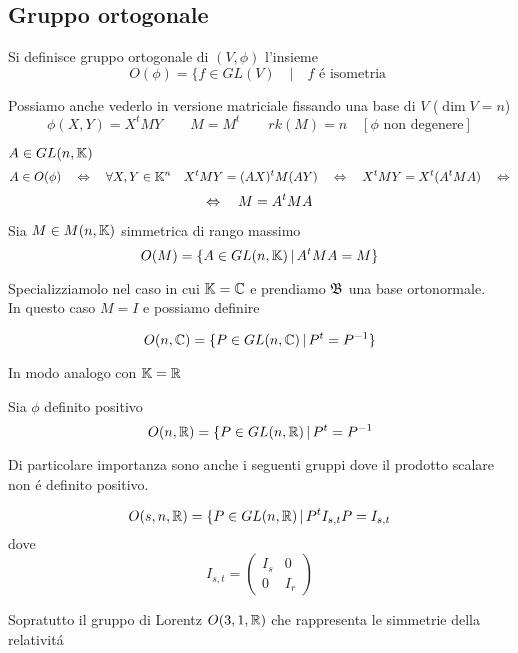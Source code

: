 \subsection{Gruppo ortogonale}
\begin{defn}\bianco
Si definisce gruppo ortogonale di $(V, \phi ) $ l'insieme
$$ O(\phi)=\{ f \in GL(V) \quad \vert \quad f \text{ \'e isometria } $$
\end{defn}
\spazio
Possiamo anche vederlo in versione matriciale fissando una base di  $V$ ($\dim V=n $)
$$ \phi(X,Y) = X^t M Y \qquad M = M^t \qquad rk(M) = n \quad \left[ \phi \text{ non degenere} \right]$$

$ A \in GL(n,\mathbb{K})$
$$ A \in O ( \phi) \quad \Leftrightarrow \quad \forall X,Y \in \mathbb{K}^n \quad X^t M Y = (AX)^t M (AY) \quad \Leftrightarrow \quad X^t M Y = X^t ( A^t M A ) \quad \Leftrightarrow $$
$$ \Leftrightarrow \quad M = A^t M A $$
\begin{defn}\bianco
Sia $M \in M(n,\mathbb{K})$ simmetrica di rango massimo 
$$ O(M) = \{ A \in GL(n,\mathbb{K}) \, \vert \, A^t M A = M \} $$
\end{defn}

Specializziamolo nel caso in cui $\mathbb{K}= \mathbb{C}$ e prendiamo $\mathfrak{B}$ una base ortonormale.\\
In questo caso $M= I $ e possiamo definire
\begin{defn}
$$ O(n, \mathbb{C}) = \{ P \in GL(n,\mathbb{C}) \, \vert \, P^t = P^{-1} \} $$
\end{defn}
In modo analogo con $\mathbb{K}= \mathbb{R}$
\begin{defn}\bianco
Sia $\phi$ definito positivo
$$O(n,\mathbb{R}) = \{ P \in GL (n, \mathbb{R} ) \, \vert \, P^t = P^{-1} $$
\end{defn}
Di particolare importanza sono anche i seguenti gruppi dove il prodotto scalare non \'e definito positivo.
\begin{defn}
$$ O(s, n, \mathbb{R}) = \{ P \in GL(n,\mathbb{R}) \, \vert \, P^t I_{s,t} P = I_{s,t} $$ dove
$$ I_{s,t}  = \left( \begin{array}{c|c}
I_s & 0 \\ \hline 0 & I_r 
\end{array} \right)$$
\end{defn}
Sopratutto il gruppo di Lorentz $ O(3,1,\mathbb{R}) $ che rappresenta le simmetrie della relativit\'a 
\newpage

